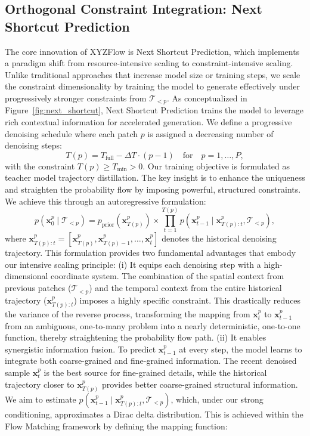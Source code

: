 \documentclass{article}
\theoremstyle{plain}
\theoremstyle{definition}
\theoremstyle{remark}
\begin{document}
\subsection{Orthogonal Constraint Integration: Next Shortcut Prediction}
\vspace{-2mm}
The core innovation of XYZFlow is Next Shortcut Prediction, which implements a paradigm shift from resource-intensive scaling to constraint-intensive scaling. Unlike traditional approaches that increase model size or training steps, we scale the constraint dimensionality by training the model to generate effectively under progressively stronger constraints from $\mathcal{T}_{<p}$. As conceptualized in Figure~\ref{fig:next_shortcut}, Next Shortcut Prediction trains the model to leverage rich contextual information for accelerated generation. We define a progressive denoising schedule where each patch $p$ is assigned a decreasing number of denoising steps:
\begin{equation}
T(p) = T_{\text{full}} - \Delta T \cdot (p-1) \quad \text{for} \quad p = 1, \dots, P,
\end{equation}
with the constraint $T(p) \geq T_{\text{min}} > 0$. Our training objective is formulated as teacher model trajectory distillation. The key insight is to enhance the uniqueness and straighten the probability flow by imposing powerful, structured constraints. We achieve this through an autoregressive formulation:
\begin{equation}
p(\mathbf{x}_0^p \mid \mathcal{T}_{<p}) = p_{\text{prior}}(\mathbf{x}_{T(p)}^p) \times \prod_{t=1}^{T(p)} p(\mathbf{x}_{t-1}^p \mid \mathbf{x}_{T(p):t}^p, \mathcal{T}_{<p}),
\label{eq:ours}
\end{equation}
where $\mathbf{x}_{T(p):t}^p = [\mathbf{x}_{T(p)}^p, \mathbf{x}_{T(p)-1}^p, \dots, \mathbf{x}_t^p]$ denotes the historical denoising trajectory. This formulation provides two fundamental advantages that embody our intensive scaling principle: (i) It equips each denoising step with a high-dimensional coordinate system. The combination of the spatial context from previous patches ($\mathcal{T}_{<p}$) and the temporal context from the entire historical trajectory ($\mathbf{x}_{T(p):t}^p$) imposes a highly specific constraint. This drastically reduces the variance of the reverse process, transforming the mapping from $\mathbf{x}_t^p$ to $\mathbf{x}_{t-1}^p$ from an ambiguous, one-to-many problem into a nearly deterministic, one-to-one function, thereby straightening the probability flow path. (ii) It enables synergistic information fusion. To predict $\mathbf{x}_{t-1}^p$ at every step, the model learns to integrate both coarse-grained and fine-grained information. The recent denoised sample $\mathbf{x}_t^p$ is the best source for fine-grained details, while the historical trajectory closer to $\mathbf{x}_{T(p)}^p$ provides better coarse-grained structural information. We aim to estimate $p(\mathbf{x}_{t-1}^p \mid \mathbf{x}_{T(p):t}^p, \mathcal{T}_{<p})$, which, under our strong conditioning, approximates a Dirac delta distribution. This is achieved within the Flow Matching framework by defining the mapping function:
\end{document}
